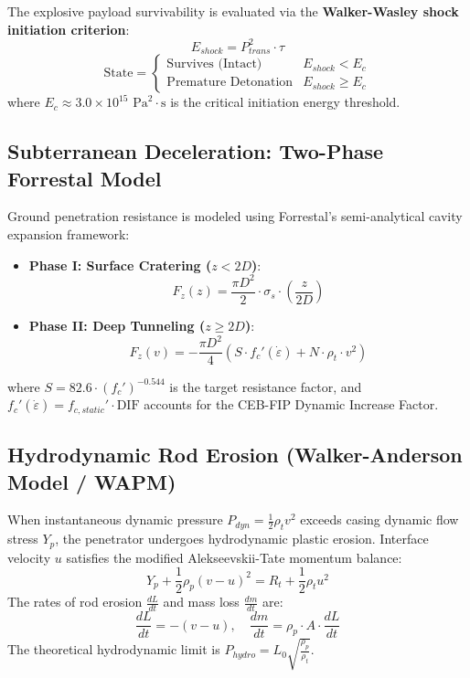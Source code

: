 \documentclass[journal,10pt,twocolumn]{IEEEtran}
\begin{document}
The explosive payload survivability is evaluated via the \textbf{Walker-Wasley shock initiation criterion}:
\begin{equation}
E_{shock} = P_{trans}^2 \cdot \tau
\end{equation}
\begin{equation}
\text{State} = \begin{cases} 
\text{Survives (Intact)} & E_{shock} < E_c \\
\text{Premature Detonation} & E_{shock} \ge E_c 
\end{cases}
\end{equation}
where $E_c \approx 3.0 \times 10^{15}\text{ Pa}^2\cdot\text{s}$ is the critical initiation energy threshold.

\subsection{Subterranean Deceleration: Two-Phase Forrestal Model}
Ground penetration resistance is modeled using Forrestal's semi-analytical cavity expansion framework:
\begin{itemize}
    \item \textbf{Phase I: Surface Cratering ($z < 2D$)}:
    \begin{equation}
    F_z(z) = \frac{\pi D^2}{2} \cdot \sigma_s \cdot \left(\frac{z}{2D}\right)
    \end{equation}
    \item \textbf{Phase II: Deep Tunneling ($z \ge 2D$)}:
    \begin{equation}
    F_z(v) = -\frac{\pi D^2}{4} \left( S \cdot f_c'(\dot{\varepsilon}) + N \cdot \rho_t \cdot v^2 \right)
    \end{equation}
\end{itemize}
where $S = 82.6 \cdot (f_c')^{-0.544}$ is the target resistance factor, and $f_c'(\dot{\varepsilon}) = f_{c,static}' \cdot \text{DIF}$ accounts for the CEB-FIP Dynamic Increase Factor.

\subsection{Hydrodynamic Rod Erosion (Walker-Anderson Model / WAPM)}
When instantaneous dynamic pressure $P_{dyn} = \frac{1}{2} \rho_t v^2$ exceeds casing dynamic flow stress $Y_p$, the penetrator undergoes hydrodynamic plastic erosion. Interface velocity $u$ satisfies the modified Alekseevskii-Tate momentum balance:
\begin{equation}
Y_p + \frac{1}{2} \rho_p (v - u)^2 = R_t + \frac{1}{2} \rho_t u^2
\end{equation}
The rates of rod erosion $\frac{dL}{dt}$ and mass loss $\frac{dm}{dt}$ are:
\begin{equation}
\frac{dL}{dt} = -(v - u), \quad \frac{dm}{dt} = \rho_p \cdot A \cdot \frac{dL}{dt}
\end{equation}
The theoretical hydrodynamic limit is $P_{hydro} = L_0 \sqrt{\frac{\rho_p}{\rho_t}}$.
\end{document}
